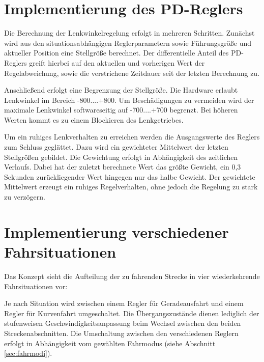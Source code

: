 \section{Implementierung des PD-Reglers}
\label{sec:pdregler}

Die Berechnung der Lenkwinkelregelung erfolgt in mehreren Schritten. Zunächst wird aus den situationsabhängigen Reglerparametern sowie Führungsgröße und aktueller Position eine Stellgröße berechnet. Der differentielle Anteil des PD-Reglers greift hierbei auf den aktuellen und vorherigen Wert der Regelabweichung, sowie die verstrichene Zeitdauer seit der letzten Berechnung zu.


Anschließend erfolgt eine Begrenzung der Stellgröße. Die Hardware erlaubt Lenkwinkel im Bereich -800....+800. Um Beschädigungen zu vermeiden wird der maximale Lenkwinkel softwareseitig auf -700....+700 begrenzt. Bei höheren Werten kommt es zu einem Blockieren des Lenkgetriebes.

Um ein ruhiges Lenkverhalten zu erreichen werden die Ausgangswerte des Reglers zum Schluss geglättet. Dazu wird ein gewichteter Mittelwert der letzten Stellgrößen gebildet. Die Gewichtung erfolgt in Abhängigkeit des zeitlichen Verlaufs. Dabei hat der zuletzt berechnete Wert das größte Gewicht, ein 0,3 Sekunden zurückliegender Wert hingegen nur das halbe Gewicht. Der gewichtete Mittelwert erzeugt ein ruhiges Regelverhalten, ohne jedoch die Regelung zu stark zu verzögern.


\section{Implementierung verschiedener Fahrsituationen}
\label{sec:fahrsituationen}

Das Konzept sieht die Aufteilung der zu fahrenden Strecke in vier wiederkehrende Fahrsituationen vor:


Je nach Situation wird zwischen einem Regler für Geradeausfahrt und einem Regler für Kurvenfahrt umgeschaltet. Die Übergangszustände dienen lediglich der stufenweisen Geschwindigkeitsanpassung beim Wechsel zwischen den beiden Streckenabschnitten. Die Umschaltung zwischen den verschiedenen Reglern erfolgt in Abhängigkeit vom gewählten Fahrmodus (siehe Abschnitt \ref{sec:fahrmodi}).

